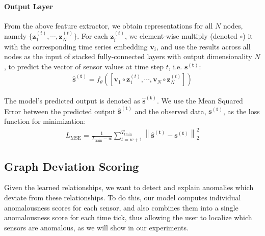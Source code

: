 \documentclass[letterpaper]{article} %
\newcommand{\Ttr}{T_\text{train}}
\begin{document}
\paragraph{Output Layer}
From the above feature extractor, we obtain representations for all $N$ nodes, namely $\{\mathbf{z}_1^{(t)}, \cdots, \mathbf{z}_N^{(t)}\}$. For each $\mathbf{z}_i^{(t)}$, we element-wise multiply (denoted $\circ$) it with the corresponding time series embedding $\mathbf{v}_i$, and use the results across all nodes as the input of stacked fully-connected layers with output dimensionality $N$, to predict the vector of sensor values at time step $t$, i.e. $\mathbf{s^{(t)}}$:
\begin{align}
    \mathbf{\hat{s}^{(t)}} = f_\theta\left(\left[ \mathbf{v}_1 \circ \mathbf{z}_{1}^{(t)}, \cdots, \mathbf{v}_N \circ \mathbf{z}_{N}^{(t)}\right]\right)
\end{align}

The model's predicted output is denoted as $\mathbf{\hat{s}^{(t)}}$. We use the Mean Squared Error between the predicted output $\mathbf{\hat{s}^{(t)}}$ and the observed data, $\mathbf{s^{(t)}}$, as the loss function for minimization:
\begin{align}
    L_{\text{MSE}} = \frac{1}{\Ttr-w}\sum_{t=w+1}^{\Ttr}\left\|\mathbf{\hat{s}^{(t)}} - \mathbf{s^{(t)}}\right\|_{2}^{2}
\end{align}

\subsection{Graph Deviation Scoring}
Given the learned relationships, we want to detect and explain anomalies which deviate from these relationships. To do this, our model computes individual anomalousness scores for each sensor, and also combines them into a single anomalousness score for each time tick, thus allowing the user to localize which sensors are anomalous, as we will show in our experiments.
\end{document}
